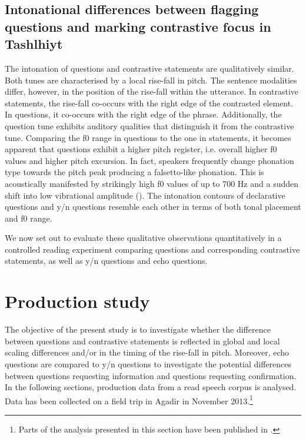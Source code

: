 \subsection{Intonational differences between flagging questions and marking contrastive focus in Tashlhiyt}
The intonation of questions and contrastive statements are qualitatively similar. Both tunes are characterised by a local rise-fall in pitch. The sentence modalities differ, however, in the position of the rise-fall within the utterance. In contrastive statements, the rise-fall co-occurs with the right edge of the contrasted element. In questions, it co-occurs with the right edge of the phrase. Additionally, the question tune exhibits auditory qualities that distinguish it from the contrastive tune. Comparing the f0 range in questions to the one in statements, it becomes apparent that questions exhibit a higher pitch register, i.e. overall higher f0 values and higher pitch excursion. In fact, speakers frequently change phonation type towards the pitch peak producing a falsetto-like phonation. This is acoustically manifested by strikingly high f0 values of up to 700 Hz and a sudden shift into low vibrational amplitude (\citealt{Laver1994}). The intonation contours of declarative questions and y/n questions resemble each other in terms of both tonal placement and f0 range. 

We now set out to evaluate these qualitative observations quantitatively in a controlled reading experiment comparing questions and corresponding contrastive statements, as well as y/n questions and echo questions. 

\section{Production study}\label{sec:5.5}
The objective of the present study is to investigate whether the difference between questions and contrastive statements is reflected in global and local scaling differences and/or in the timing of the rise-fall in pitch. Moreover, echo questions are compared to y/n questions to investigate the potential differences between questions requesting information and questions requesting confirmation. In the following sections, production data from a read speech corpus is analysed. Data has been collected on a field trip in Agadir in November 2013.\footnote{Parts of the analysis presented in this section have been published in \citet{RoettgerGrice2015}.}

